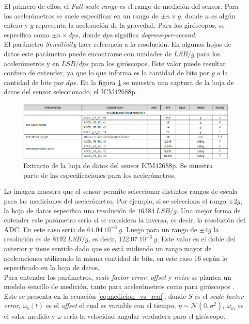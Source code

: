 El primero de ellos, el \textit{Full-scale range} es el rango de medición del sensor. Para los acelerómetros se suele especificar en un rango de $\pm n \times g$, donde $n$ es algún entero y $g$ representa la aceleración de la gravedad. Para los giróscopos, se especifica como $\pm n \times dps$, donde $dps$ significa \textit{degrees-per-second}.\\

El parámetro \textit{Sensitivity} hace referencia a la resolución. En algunas hojas de datos este parámetro puede encontrarse con unidades de $LSB/g$ para los acelerómetros y en $LSB/dps$ para los giróscopos. Este valor puede resultar confuso de entender, ya que lo que informa es la cantidad de bits por $g$ o la cantidad de bits por $dps$. En la figura \ref{fig:ICM_42688_datasheet} se muestra una captura de la hoja de datos del sensor seleccionado, el ICM42688p. 

\begin{figure}[H]
    \centering
    \includegraphics[width=\textwidth]{img/ICM_42688_datasheet.png}
    \caption{Extracto de la hoja de datos del sensor ICM42688p. Se muestra parte de las especificaciones para los acelerómetros.}
    \label{fig:ICM_42688_datasheet}    
\end{figure}

La imagen muestra que el sensor permite seleccionar distintos rangos de escala para las mediciones del acelerómetro. Por ejemplo, si se selecciona el rango $\pm 2g$, la hoja de datos especifica una resolución de $16384 \ LSB/g$. Una mejor forma de entender este parámetro sería si se considera la inversa, es decir, la resolución del ADC. En este caso sería de $61.04 \ 10^{-6} \ g$. Luego para un rango de $\pm 4g$ la resolución es de $8192 \ LSB/g$, es decir, $122.07 \ 10^{-6} \ g$. Este valor es el doble del anterior y tiene sentido dado que se está midiendo un rango mayor de aceleraciones utilizando la misma cantidad de bits, en este caso 16 según lo especificado en la hoja de datos.\\

Para entender los parámetros, \textit{scale factor error}, \textit{offset} y \textit{noise} se plantea un modelo sencillo de medición, tanto para acelerómetros como para giróscopos \cite{borodacz2022review}. Este se presenta en la ecuación \eqref{eq:medicion_vs_real}, donde $S$ es el \textit{scale factor error}, $\omega_b(t)$ es el \textit{offset} el cual es variable con el tiempo, $\eta \sim \mathcal{N}(0,\sigma^2)$, $\omega_m$ es el valor medido y $\omega$ sería la velocidad angular verdadera para el giróscopo.

